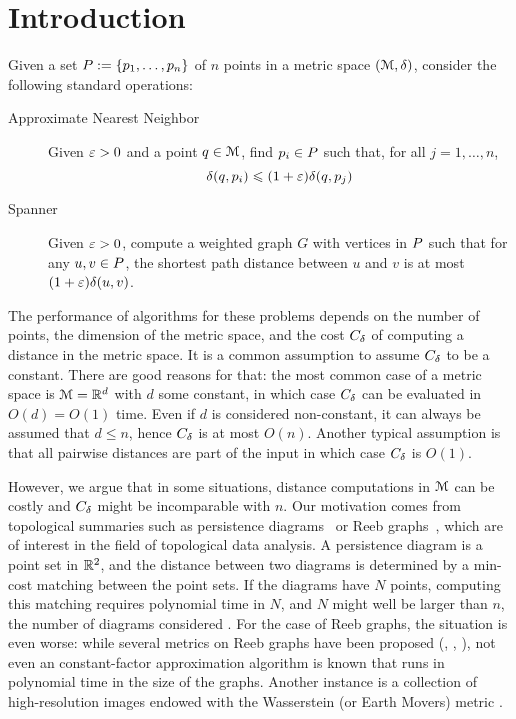 \section{Introduction}

Given a set $P:=\{p_1,\ldots,p_n\}$ of $n$ points
in a metric space $(\mathcal{M},\delta)$, 
consider the following standard operations:

\begin{description}
\item[Approximate Nearest Neighbor] Given $\varepsilon>0$ and a point $q\in\mathcal{M}$,
find $p_i\in P$ such that, for all $j=1,\ldots,n$,
\[\delta(q,p_i)\leqslant(1+\varepsilon)\delta(q,p_j)\]

\item[Spanner] Given $\varepsilon>0$, compute a weighted graph $G$ with vertices in $P$
such that for any $u,v\in P$, the shortest path distance between $u$ and $v$
is at most $(1+\varepsilon)\delta(u,v)$.
\end{description}


The performance of algorithms for these problems depends on the number of points,
the dimension of the metric space, and the cost $C_{\delta}$ of computing a distance in the metric space.
It is a common assumption to assume $C_{\delta}$ to be a constant.
There are good reasons for that: the most common case of a metric space
is $\mathcal{M}=\mathbb{R}^d$ with $d$ some constant, in which case $C_{\delta}$ can be evaluated in $O(d)=O(1)$ time.
Even if $d$ is considered non-constant,
it can always be assumed that $d\leq n$, hence $C_{\delta}$ is at most $O(n)$.
Another typical assumption is that all pairwise distances are part of the input
in which case $C_{\delta}$ is $O(1)$.

However, we argue that in some situations, distance computations
in $\mathcal{M}$ can be costly and $C_{\delta}$ might be incomparable
with $n$. Our motivation comes from topological summaries
such as persistence diagrams~\cite{elz-topological} or Reeb graphs~\cite{reeb-survey}, which are of interest
in the field of topological data analysis. A persistence diagram
is a point set in $\mathbb{R}^2$, and the distance between two diagrams
is determined by a min-cost matching between the point sets.
If the diagrams have $N$ points, computing this matching requires
polynomial time in $N$, and $N$ might well be larger than $n$, the number
of diagrams considered \cite{cohen2007stability}. For the case of Reeb graphs, the situation is even
worse: while several metrics on Reeb graphs have been proposed (\cite{bauer2014measuring}, \cite{de2016categorified},
\cite{di2016edit}),
not even an constant-factor approximation algorithm is known that runs
in polynomial time in the size of the graphs.
Another instance is a collection of high-resolution images
endowed with the Wasserstein (or Earth Movers) metric \cite{rubner2000earth}.

